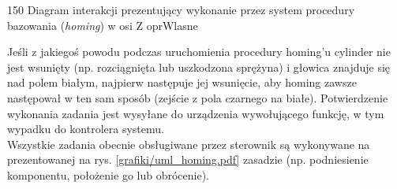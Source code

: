 	{150}
	{Diagram interakcji prezentujący wykonanie przez system procedury bazowania ({\it homing}) w osi Z}
	{oprWlasne}

Jeśli z jakiegoś powodu podczas uruchomienia procedury homing'u cylinder nie jest wsunięty (np. rozciągnięta lub uszkodzona sprężyna) i głowica znajduje się nad polem białym, najpierw następuje jej wsunięcie, aby homing zawsze następował w ten sam sposób (zejście z pola czarnego na białe). Potwierdzenie wykonania zadania jest wysyłane do urządzenia wywołującego funkcję, w tym wypadku do kontrolera systemu. \\

Wszystkie zadania obecnie obsługiwane przez sterownik są wykonywane na prezentowanej na rys. \ref{grafiki/uml_homing.pdf} zasadzie (np. podniesienie komponentu, położenie go lub obrócenie). 




